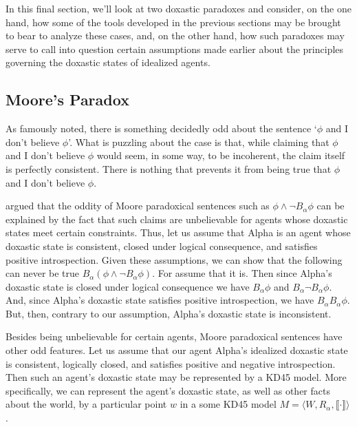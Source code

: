 In this final section, we'll look at two doxastic paradoxes and consider, on the one hand, how some of the tools developed in the previous sections may be brought to bear to analyze these cases, and, on the other hand, how such paradoxes may serve to call into question certain assumptions made earlier about the principles governing the doxastic states of idealized agents.

\subsection{Moore's Paradox}\label{caie-section4-1}

As \citet{Moore1} famously noted, there is something decidedly odd about the sentence `$\phi$ and I don't believe $\phi$'.
What is puzzling about the case is that, while claiming that $\phi$ and I don't believe $\phi$ would seem, in some way, to be incoherent, the claim itself is perfectly consistent.
There is nothing that prevents it from being true that $\phi$ and I don't believe $\phi$. 

\citet{Hintikka1} argued that the oddity of Moore paradoxical sentences such as $\phi \wedge \lnot B_\alpha \phi$ can be explained by the fact that such claims are unbelievable for agents whose doxastic states meet certain constraints. 
Thus, let us assume that Alpha is an agent whose doxastic state is consistent, closed under logical consequence, and satisfies positive introspection.
Given these assumptions, we can show that the following can never be true $B_\alpha(\phi \wedge \lnot B_\alpha \phi)$.
For assume that it is.
Then since Alpha's doxastic state is closed under logical consequence we have $B_\alpha \phi$ and $B_\alpha \lnot B_\alpha \phi$.
And, since Alpha's doxastic state satisfies positive introspection, we have $B _\alpha B_\alpha \phi$.
But, then, contrary to our assumption, Alpha's doxastic state is inconsistent.

Besides being unbelievable for certain agents, Moore paradoxical sentences have other odd features.
Let us assume that our agent Alpha's idealized doxastic state is consistent, logically closed, and satisfies positive and negative introspection.
Then such an agent's doxastic state may be represented by a KD45 model.
More specifically, we can represent the agent's doxastic state, as well as other facts about the world, by a particular point $w$ in a some KD45 model $M = \langle W, R_\alpha, \llbracket \cdot \rrbracket \rangle$.

